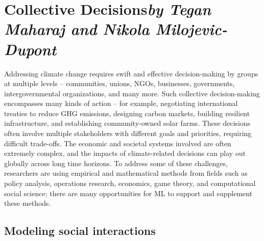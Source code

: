 \documentclass[11pt]{report}
\begin{document}
\section{Collective Decisions\texorpdfstring{\hfill\textit{by Tegan Maharaj and Nikola Milojevic-Dupont}}{}}
\label{sec:toolsforsociety}

Addressing climate change requires swift and effective decision-making by groups at multiple levels -- communities, unions, NGOs, businesses, governments, intergovernmental organizations, and many more. Such collective decision-making encompasses many kinds of action -- for example, negotiating international treaties to reduce GHG emissions, designing carbon markets, building resilient infrastructure, and establishing community-owned solar farms.
These decisions often involve multiple stakeholders with different goals and priorities, requiring difficult trade-offs. The economic and societal systems involved are often extremely complex, and the impacts of climate-related decisions can play out globally across long time horizons. 
To address some of these challenges, researchers are using empirical and mathematical methods from fields such as policy analysis, operations research, economics, game theory, and
computational social science; there are many opportunities for ML to support and supplement these methods.  


\subsection{Modeling social interactions}\label{sec:coordination}
\end{document}
